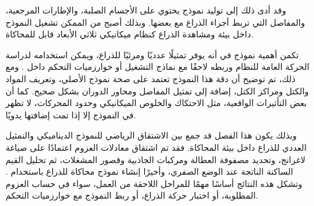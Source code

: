 \begin{flushleft}
\end{flushleft}

وقد أدى ذلك إلى توليد نموذج  يحتوي على الأجسام الصلبة، والإطارات المرجعية، والمفاصل التي تربط أجزاء الذراع مع بعضها. وبذلك أصبح من الممكن تشغيل النموذج داخل بيئة   ومشاهدة الذراع كنظام ميكانيكي ثلاثي الأبعاد قابل للمحاكاة.

تكمن أهمية نموذج  في أنه يوفر تمثيلًا عدديًا ومرئيًا للذراع، ويمكن استخدامه لدراسة الحركة العامة للنظام وربطه لاحقًا مع نماذج التشغيل أو خوارزميات التحكم داخل . ومع ذلك، تم توضيح أن دقة هذا النموذج تعتمد على صحة نموذج  الأصلي، وتعريف المواد والكتل ومراكز الكتل، إضافة إلى تمثيل المفاصل ومحاور الدوران بشكل صحيح. كما أن بعض التأثيرات الواقعية، مثل الاحتكاك والخلوص الميكانيكي وحدود المحركات، لا تظهر في النموذج إلا إذا تمت إضافتها يدويًا.

وبذلك يكون هذا الفصل قد جمع بين الاشتقاق الرياضي للنموذج الديناميكي والتمثيل العددي للذراع داخل بيئة المحاكاة. فقد تم اشتقاق معادلات العزوم اعتمادًا على صياغة لاغرانج، وتحديد مصفوفة العطالة ومركبات الجاذبية وقصور المشغلات، ثم تحليل القيم الساكنة الناتجة عند الوضع الصفري، وأخيرًا إنشاء نموذج محاكاة للذراع باستخدام  . وتشكل هذه النتائج أساسًا مهمًا للمراحل اللاحقة من العمل، سواء في حساب العزوم المطلوبة، أو اختبار حركة الذراع، أو ربط النموذج مع خوارزميات التحكم.